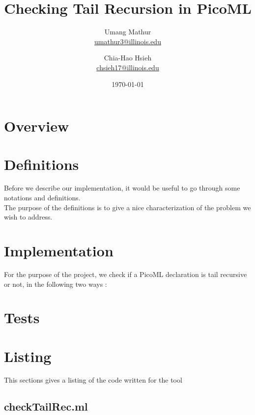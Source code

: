 \documentclass{article}
\title{Checking Tail Recursion in PicoML}
\author{Umang Mathur \\ \href{mailto:umathur3@illinois.edu}{umathur3@illinois.edu}
\and Chia-Hao Hsieh \\ \href{mailto:chsieh17@illinois.edu}{chsieh17@illinois.edu}}
\date{\today}
\begin{document}
\maketitle

\section{Overview}



\newpage

\section{Definitions}
Before we describe our implementation, it would be useful to go through some notations and definitions.\\
The purpose of the definitions is to give a nice characterization of the problem we wish to address.\\



\newpage 

\section{Implementation}
For the purpose of the project, we check if a PicoML declaration is  tail recursive or not, in the following two ways :



\newpage

\section{Tests}



\newpage

\section{Listing}

This sections gives a listing of the code written for the tool \tool

\subsection{checkTailRec.ml}



\newpage
\end{document}

